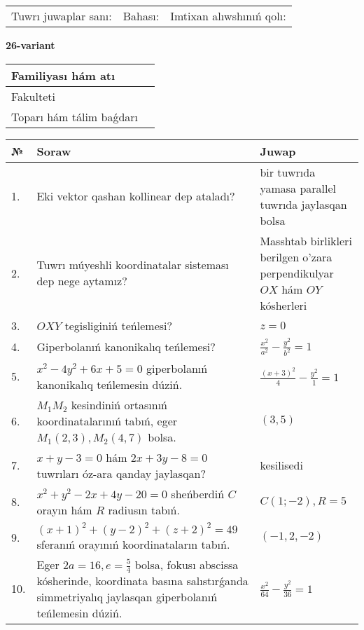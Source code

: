 \documentclass{article}
\begin{document}
\vspace{1cm}

\begin{tabular}{lll}
Tuwrı juwaplar sanı: \underline{\hspace{1.5cm}} & 
Bahası: \underline{\hspace{1.5cm}} & 
Imtixan alıwshınıń qolı: \underline{\hspace{2cm}} \\
\end{tabular}

\egroup

\newpage


\textbf{26-variant}\\

\bgroup
\def\arraystretch{1.6} %

\begin{tabular}{|m{5.7cm}|m{9.5cm}|}
\hline
Familiyası hám atı & \\
\hline
Fakulteti  & \\
\hline
Toparı hám tálim baǵdarı  & \\
\hline
\end{tabular}

\vspace{1cm}

\begin{tabular}{|m{0.7cm}|m{10cm}|m{4cm}|}
\hline
№ & Soraw & Juwap \\
\hline
1. & Eki vektor qashan kollinear dep ataladı? & bir tuwrıda yamasa parallel tuwrıda jaylasqan bolsa \\
\hline
2. & Tuwrı múyeshli koordinatalar sisteması dep nege aytamız? & Masshtab birlikleri berilgen o'zara perpendikulyar $OX$ hám $OY$ kósherleri \\
\hline
3. & $OXY$ tegisliginiń teńlemesi? & $z=0$ \\
\hline
4. & Giperbolanıń kanonikalıq teńlemesi? & $\frac{x^2}{a^2}-\frac{y^2}{b^2}=1$ \\
\hline
5. & $x^{2}-4y^{2}+6x+5=0$ giperbolanıń kanonikalıq teńlemesin dúziń. & $\frac{(x+3)^{2}}{4}-\frac{y^{2}}{1}=1$ \\
\hline
6. & $M_{1}M_{2}$ kesindiniń ortasınıń koordinatalarınıń tabıń, eger $M_{1} (2, 3), M_{2} (4, 7)$ bolsa. & $(3,5)$ \\
\hline
7. & $x+y-3=0$ hám $2x+3y-8=0$ tuwrıları óz-ara qanday jaylasqan? & kesilisedi \\
\hline
8. & $x^{2}+y^{2}-2x+4y-20=0$ sheńberdiń $C$ orayın hám $R$ radiusın tabıń. & $C(1;-2), R=5$ \\
\hline
9. & $(x+1)^{2}+(y-2) ^{2}+(z+2) ^{2}=49$ sferanıń orayınıń koordinataların tabıń. & $(-1,2,-2)$ \\
\hline
10. & Eger $2a=16, e=\frac{5}{4}$ bolsa, fokusı abscissa kósherinde, koordinata basına salıstırǵanda simmetriyalıq jaylasqan giperbolanıń teńlemesin dúziń. & $\frac{x^{2}}{64}-\frac{y^{2}}{36}=1$ \\
\hline
\end{tabular}
\end{document}
